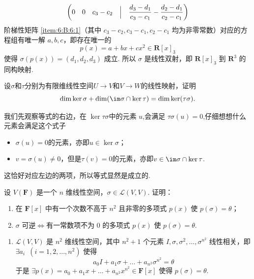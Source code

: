 \begin{exercise}
\begin{exgroup}
\begin{answer}
\begin{align}
\begin{pmatrix}
                                   0 & 0   & c_3 - c_2 & \Bigm| & \dfrac{d_3 - d_1}{c_3 - c_1} - \dfrac{d_2 - d_1}{c_2 - c_1}
                               \end{pmatrix} \label{item:6:B:6:1}
          \end{align}
          阶梯性矩阵 \ref*{item:6:B:6:1}（其中 $ c_3 - c_2, c_3 - c_1, c_2 - c_1 $ 均为非零常数）对应的方程组有唯一解 $ a, b, c $，即存在唯一的
          \[ p(x) = a + bx + cx^2 \in \mathbf{R}[x]_3 \]
          使得 $ \sigma(p(x)) = (d_1, d_2, d_3) $ 成立. 所以 $ \sigma $ 是线性双射，即 $ \mathbf{R}[x]_3 $ 到 $ \mathbf{R}^3 $ 的同构映射.
        \end{answer}

        \item 设$\sigma$和$\tau$分别为有限维线性空间$U\to V$和$V\to W$的线性映射，证明
        \[\dim\ker\sigma+\dim(\im\sigma\cap\ker\tau)=\dim\ker(\tau\sigma).\]

        \begin{answer}
            我们先观察等式的右边，在 $\ker \tau \sigma$中的元素 $u$,会满足 $\tau \sigma (u) = 0 $,仔细想想什么元素会满足这个式子
            \begin{itemize}
                \item $\sigma(u)=0$的元素，亦即$u\in \ker \sigma$；
                \item $v=\sigma(u)\neq 0$，但是$\tau(v)=0$的元素，亦即$v\in \im \sigma \cap \ker \tau$.
            \end{itemize}
            这恰好对应左边的两项，所以等式显然是成立的.
        \end{answer}
    \end{exgroup}

    \begin{exgroup}
        \item 设 $V(\mathbf{F})$ 是一个 $n$ 维线性空间，$\sigma \in \mathcal{L}(V,V)$. 证明：
        \begin{enumerate}
            \item 在 $\mathbf{F}[x]$ 中有一个次数不高于 $n^2$ 且非零的多项式 $p(x)$ 使 $p(\sigma) = \theta$；

            \item $\sigma$ 可逆$\iff$有一常数项不为 0 的多项式 $p(x)$ 使 $p(\sigma) = \theta$.
        \end{enumerate}
        \begin{answer}
            \begin{enumerate}
                \item \label{item:5:C:1:1}
                      $ \mathcal{L}(V, V) $ 是 $ n^2 $ 维线性空间，其中 $ n^2 + 1 $ 个元素 $ I, \sigma, \sigma^2, \ldots, \sigma^{n^2} $ 线性相关，即 $ \exists a_i\enspace (i = 1, 2, \ldots, n^2) $ 使得
                      \[ a_0 I + a_1 \sigma + \ldots + a_{n^2} \sigma^{n^2} = \theta \]
                      于是 $ \exists p(x) = a_0 + a_1 x + \ldots + a_{n^2} x^{n^2} \in \mathbf{F}[x] $ 使得 $ p(\sigma) = \theta $.


\end{enumerate}
\end{answer}
\end{exgroup}
\end{exercise}
